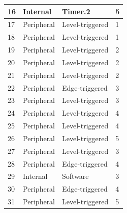 \begin{longtable}[c]{ |p{1.5cm}|p{4.5cm}|p{4.5cm}|p{4cm}| }
    \hline
    16  & Internal      & Timer.2           & 5                 \\
    \hline
    17  & Peripheral    & Level-triggered   & 1                 \\
    \hline
    18  & Peripheral    & Level-triggered   & 1                 \\
    \hline
    19  & Peripheral    & Level-triggered   & 2                 \\
    \hline
    20  & Peripheral    & Level-triggered   & 2                 \\
    \hline
    21  & Peripheral    & Level-triggered   & 2                 \\
    \hline
    22  & Peripheral    & Edge-triggered    & 3                 \\
    \hline
    23  & Peripheral    & Level-triggered   & 3                 \\
    \hline
    24  & Peripheral    & Level-triggered   & 4                 \\
    \hline
    25  & Peripheral    & Level-triggered   & 4                 \\
    \hline
    26  & Peripheral    & Level-triggered   & 5                 \\
    \hline
    27  & Peripheral    & Level-triggered   & 3                 \\
    \hline
    28  & Peripheral    & Edge-triggered    & 4                 \\
    \hline
    29  & Internal    & Software          & 3                 \\
    \hline
    30  & Peripheral    & Edge-triggered    & 4                 \\
    \hline
    31  & Peripheral    & Level-triggered   & 5                 \\
    
\end{longtable}
